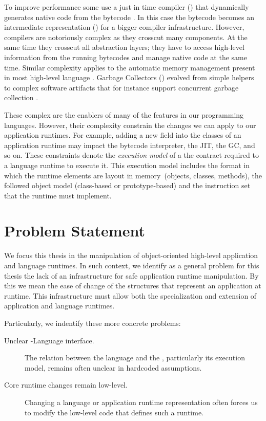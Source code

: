 
To improve performance some \VMs use a just in time compiler (\JIT) that dynamically generates native code from the bytecode \cite{Deut84a}.
In this case the bytecode becomes an intermediate representation (\IR) for a bigger compiler infrastructure.
However, \JIT compilers are notoriously complex as they crosscut many \VM components.
At the same time they crosscut all abstraction layers; they have to access high-level information from the running bytecodes and manage native code at the same time.
Similar complexity applies to the automatic memory management present in most high-level language \VMs.
Garbage Collectors (\GC) evolved from simple helpers to complex software artifacts that for instance support concurrent garbage collection \cite{Clic05a}.

These complex \VMs are the enablers of many of the features in our programming languages. However, their complexity constrain the changes we can apply to our application runtimes. For example, adding a new field into the classes of an application runtime may impact the bytecode interpreter, the JIT, the GC, and so on. These constraints denote the \emph{execution model} of a \VM \ie the contract required to a language runtime to execute it. This execution model includes the format in which the runtime elements are layout in memory~(objects, classes, methods), the followed object model (\eg class-based or prototype-based) and the instruction set that the runtime must implement.

\section{Problem Statement}

We focus this thesis in the manipulation of object-oriented high-level application and language runtimes. In such context, we identify as a general problem for this thesis the lack of an infrastructure for safe application runtime manipulation. By this we mean the ease of change of the structures that represent an application at runtime. This infrastructure must allow both the specialization and extension of application and language runtimes.

Particularly, we indentify these more concrete problems:
\begin{description}
\item[Unclear \VM-Language interface.] The relation between the language and the \VM, particularly its execution model, remains often unclear in \VM hardcoded assumptions.
\item[Core runtime changes remain low-level.] Changing a language or application runtime representation often forces us to modify the low-level code that defines such a runtime.
\end{description}


